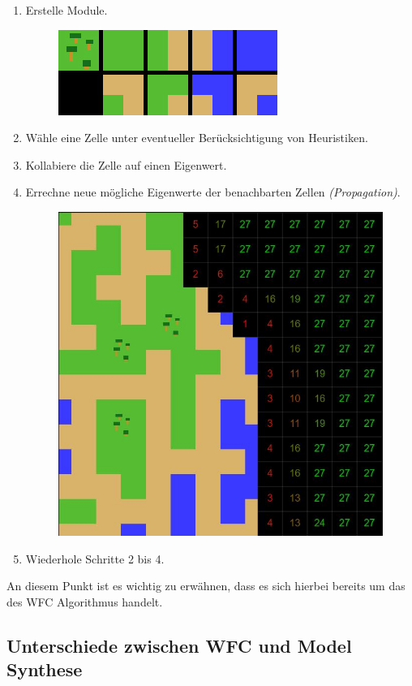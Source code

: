 \documentclass[12pt, a4paper,twoside,openany]{report} %
\begin{document}
\begin{enumerate}
    \itemsep-1em
    \item Erstelle Module.
    \begin{figure}[H]
        \centering
        \includegraphics[width=0.4\linewidth]{images/modules-cells.JPG}
    \end{figure}
    \item Wähle eine Zelle unter eventueller Berücksichtigung von Heuristiken.
    \item Kollabiere die Zelle auf einen Eigenwert.
    \item Errechne neue mögliche Eigenwerte der benachbarten Zellen \textit{(Propagation)}.
    \begin{figure}[H]
        \centering
        \includegraphics[width=0.6\linewidth]{images/collapse-cells.JPG}
    \end{figure}
    \item Wiederhole Schritte 2 bis 4.
\end{enumerate}

An diesem Punkt ist es wichtig zu erwähnen,
dass es sich hierbei bereits um das  des WFC Algorithmus handelt.

\subsection{Unterschiede zwischen WFC und Model Synthese}
\end{document}
